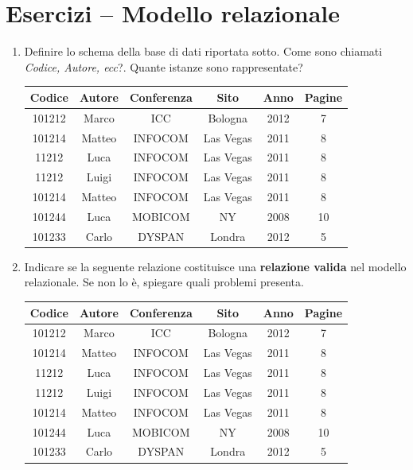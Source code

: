 \documentclass[a4paper,12pt]{article}
\begin{document}
\section{Esercizi -- Modello relazionale}

\begin{enumerate}

\item 

Definire lo schema della base di dati riportata sotto. Come sono chiamati \textit{Codice, Autore, ecc}?. Quante istanze sono rappresentate?

\begin{center}
\begin{tabular}{|c|c|c|c|c|c|}
\hline
\textbf{Codice} & \textbf{Autore} & \textbf{Conferenza} & \textbf{Sito} & \textbf{Anno} & \textbf{Pagine} \\
\hline
101212 & Marco & ICC & Bologna & 2012 & 7 \\
101214 & Matteo & INFOCOM & Las Vegas & 2011 & 8 \\
11212 & Luca & INFOCOM & Las Vegas & 2011 & 8 \\
11212 & Luigi & INFOCOM & Las Vegas & 2011 & 8 \\
101214 & Matteo & INFOCOM & Las Vegas & 2011 & 8 \\
101244 & Luca & MOBICOM & NY & 2008 & 10 \\
101233 & Carlo & DYSPAN & Londra & 2012 & 5 \\
\hline
\end{tabular}
\end{center}


\item Indicare se la seguente relazione costituisce una \textbf{relazione valida} nel modello relazionale. Se non lo è, spiegare quali problemi presenta.

\begin{center}
\begin{tabular}{|c|c|c|c|c|c|}
\hline
\textbf{Codice} & \textbf{Autore} & \textbf{Conferenza} & \textbf{Sito} & \textbf{Anno} & \textbf{Pagine} \\
\hline
101212 & Marco & ICC & Bologna & 2012 & 7 \\
101214 & Matteo & INFOCOM & Las Vegas & 2011 & 8 \\
11212 & Luca & INFOCOM & Las Vegas & 2011 & 8 \\
11212 & Luigi & INFOCOM & Las Vegas & 2011 & 8 \\
101214 & Matteo & INFOCOM & Las Vegas & 2011 & 8 \\
101244 & Luca & MOBICOM & NY & 2008 & 10 \\
101233 & Carlo & DYSPAN & Londra & 2012 & 5 \\
\hline
\end{tabular}
\end{center}



\end{enumerate}
\end{document}
